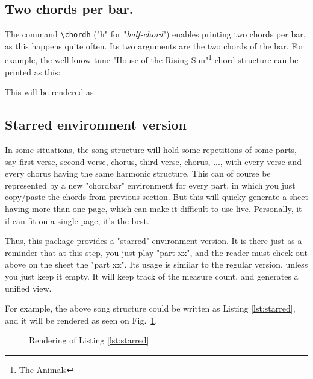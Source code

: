\documentclass[11pt]{article}
\begin{document}
\subsection{Two chords per bar.} 
The command \verb|\chordh| ("h" for "{\em half-chord}") enables printing two chords per bar, as this happens quite often.
Its two arguments are the two chords of the bar.
For example, the well-know tune "House of the Rising Sun"\footnote{The Animals} chord structure can be printed as this:



This will be rendered as:
\def\chordFontSize{\Large\bfseries}
\resetchordbars
\countbarsNo



\subsection{Starred environment version}

In some situations, the song structure will hold some repetitions of some parts, say first verse, second verse, chorus, third verse, chorus, ..., with every verse and every chorus having the same harmonic structure.
This can of course be represented by a new "chordbar" environment for every part, in which you just copy/paste the chords from previous section.
But this will quicky generate a sheet having more than one page, which can make it difficult to use live.
Personally, it if can fit on a single page, it's the best.

Thus, this package provides a "starred" environment version.
It is there just as a reminder that at this step, you just play "part xx", and the reader must check out above on the sheet the "part xx".
Its usage is similar to the regular version, unless you just keep it empty.
It will keep track of the measure count, and generates a unified view. 



For example, the above song structure could be written as Listing \ref{lst:starred}, and it will be rendered as seen on Fig.~\ref{fig:starred}.
\def\chordFontSize{\Large\bfseries}
\resetchordbars
\countbarsYes
\begin{figure}
\begin{mdframed}

\end{mdframed}
\caption{Rendering of Listing \ref{lst:starred}}
\label{fig:starred}
\end{figure}
\end{document}
